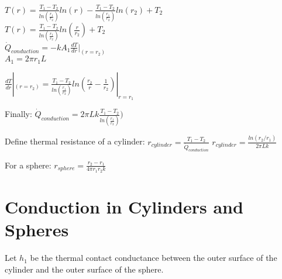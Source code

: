 \documentclass{article}
\begin{document}
$T(r) = \frac{T_1 - T_2}{ln(\frac{r_1}{r_2})} ln(r) - \frac{T_1 - T_2}{ln(\frac{r_1}{r_2})} ln(r_2) + T_2$ \\

$T(r) = \frac{T_1 - T_2}{ln(\frac{r_1}{r_2})} ln(\frac{r}{r_2}) + T_2$ \\

$\dot{Q}_{conduction} = -kA_1 \frac{dT}{dr}|_{(r = r_2)}$ \\
$A_1 = 2\pi r_1 L$

$\frac{dT}{dr}|_{(r = r_2)} = \frac{T_1 - T_2}{ln(\frac{r_1}{r_2})} ln(\frac{r_2}{r} - \frac{1}{r_2})|_{r = r_1}$

Finally:
$\dot{Q}_{conduction} = 2\pi L k \frac{T_1 - T_2}{ln(\frac{r_1}{r_2})})$

Define thermal resistance of a cylinder:
$r_{cylinder} = \frac{T_1 - T_2}{\dot{Q}_{conduction}}$
$r_{cylinder} = \frac{ln(r_2/r_1)}{2\pi Lk}$

For a sphere:
$r_{sphere} = \frac{r_2 - r_1}{4\pi r_1 r_2 k}$

\section{Conduction in Cylinders and Spheres}
Let $h_1$ be the thermal contact conductance between the outer surface of the cylinder and the outer surface of the sphere. 
\end{document}
